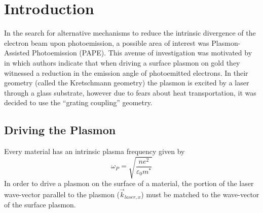 
\section{Introduction}

In the search for alternative mechanisms to reduce the intrinsic divergence of the electron beam upon photoemission, a possible area of interest was Plasmon-Assisted Photoemission (PAPE). 
This avenue of investigation was motivated by  in which authors  indicate that when driving a surface plasmon on gold they witnessed a reduction in the emission angle of photoemitted electrons.
In their geometry (called the Kretschmann geometry) the plasmon is excited by a laser through a glass substrate, however due to fears about heat transportation, it was decided to use the ``grating coupling'' geometry.

\subsection{Driving the Plasmon}

Every material has an intrinsic plasma frequency given by 
\begin{equation}
  \omega_{P} = \sqrt{\frac{n e^2}{\varepsilon_{0} m^*}}
\end{equation}
In order to drive a plasmon on the surface of a material, the portion of the laser wave-vector parallel to the plasmon ($\vec{k}_{laser,x}$) must be matched to the wave-vector of the surface plasmon.
